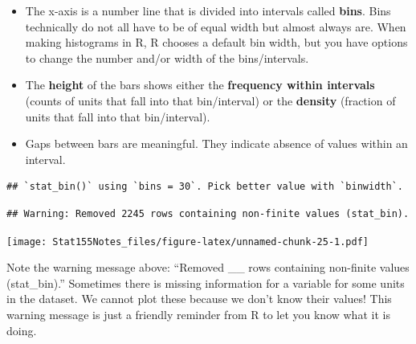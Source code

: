 \documentclass[]{book}
\newenvironment{Shaded}{\begin{snugshade}}{\end{snugshade}}
\newcommand{\DataTypeTok}[1]{\textcolor[rgb]{0.13,0.29,0.53}{#1}}
\newcommand{\KeywordTok}[1]{\textcolor[rgb]{0.13,0.29,0.53}{\textbf{#1}}}
\newcommand{\NormalTok}[1]{#1}
\newcommand{\OperatorTok}[1]{\textcolor[rgb]{0.81,0.36,0.00}{\textbf{#1}}}
\newcommand{\StringTok}[1]{\textcolor[rgb]{0.31,0.60,0.02}{#1}}
\providecommand{\tightlist}{%
  \setlength{\itemsep}{0pt}\setlength{\parskip}{0pt}}
\begin{document}
\begin{itemize}
\tightlist
\item
  The x-axis is a number line that is divided into intervals called \textbf{bins}. Bins technically do not all have to be of equal width but almost always are. When making histograms in R, R chooses a default bin width, but you have options to change the number and/or width of the bins/intervals.
\item
  The \textbf{height} of the bars shows either the \textbf{frequency within intervals} (counts of units that fall into that bin/interval) or the \textbf{density} (fraction of units that fall into that bin/interval).
\item
  Gaps between bars are meaningful. They indicate absence of values within an interval.
\end{itemize}

\begin{Shaded}
\end{Shaded}

\begin{verbatim}
## `stat_bin()` using `bins = 30`. Pick better value with `binwidth`.
\end{verbatim}

\begin{verbatim}
## Warning: Removed 2245 rows containing non-finite values (stat_bin).
\end{verbatim}

\texttt{[image: Stat155Notes\_files/figure-latex/unnamed-chunk-25-1.pdf]}

Note the warning message above: ``Removed \_\_ rows containing non-finite values (stat\_bin).'' Sometimes there is missing information for a variable for some units in the dataset. We cannot plot these because we don't know their values! This warning message is just a friendly reminder from R to let you know what it is doing.
\end{document}
